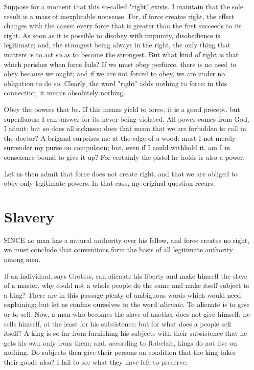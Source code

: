 \documentclass[12pt]{book}
\begin{document}
Suppose for a moment that this so-called "right" exists. I maintain that the sole result is a mass of inexplicable nonsense. For, if force creates right, the effect changes with the cause: every force that is greater than the first succeeds to its right. As soon as it is possible to disobey with impunity, disobedience is legitimate; and, the strongest being always in the right, the only thing that matters is to act so as to become the strongest. But what kind of right is that which perishes when force fails? If we must obey perforce, there is no need to obey because we ought; and if we are not forced to obey, we are under no obligation to do so. Clearly, the word "right" adds nothing to force: in this connection, it means absolutely nothing.

Obey the powers that be. If this means yield to force, it is a good precept, but superfluous: I can answer for its never being violated. All power comes from God, I admit; but so does all sickness: does that mean that we are forbidden to call in the doctor? A brigand surprises me at the edge of a wood: must I not merely surrender my purse on compulsion; but, even if I could withhold it, am I in conscience bound to give it up? For certainly the pistol he holds is also a power.

Let us then admit that force does not create right, and that we are obliged to obey only legitimate powers. In that case, my original question recurs.

\section{Slavery}
SINCE no man has a natural authority over his fellow, and force creates no right, we must conclude that conventions form the basis of all legitimate authority among men.

If an individual, says Grotius, can alienate his liberty and make himself the slave of a master, why could not a whole people do the same and make itself subject to a king? There are in this passage plenty of ambiguous words which would need explaining; but let us confine ourselves to the word \textit{alienate}. To alienate is to give or to sell. Now, a man who becomes the slave of another does not give himself; he sells himself, at the least for his subsistence: but for what does a people sell itself? A king is so far from furnishing his subjects with their subsistence that he gets his own only from them; and, according to Rabelais, kings do not live on nothing. Do subjects then give their persons on condition that the king takes their goods also? I fail to see what they have left to preserve.
\end{document}
